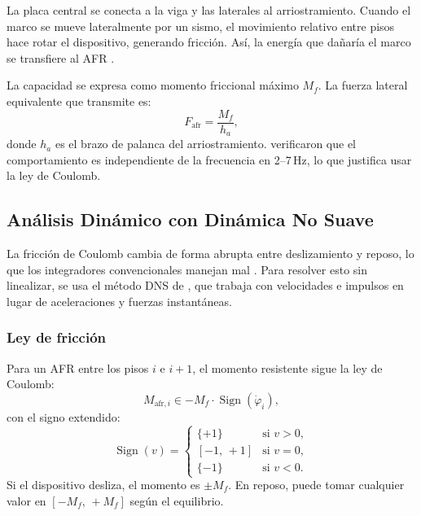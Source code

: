 \documentclass[preprint,12pt,authoryear]{elsarticle}
\newcommand{\Mf}{M_{\!f}}
\newcommand{\ha}{h_a}
\begin{document}
La placa central se conecta a la viga y las laterales al arriostramiento.
Cuando el marco se mueve lateralmente por un sismo, el movimiento relativo
entre pisos hace rotar el dispositivo, generando fricción. Así, la energía
que dañaría el marco se transfiere al AFR \citep{kim_use_2011}.

La capacidad se expresa como momento friccional máximo $\Mf$. La fuerza
lateral equivalente que transmite es:
\begin{equation}
    F_{\mathrm{afr}} = \frac{\Mf}{\ha},
    \label{eq:Fafr}
\end{equation}
donde $\ha$ es el brazo de palanca del arriostramiento. \citet{Mualla2002}
verificaron que el comportamiento es independiente de la frecuencia en
2--7\,Hz, lo que justifica usar la ley de Coulomb.

\subsection{Análisis Dinámico con Dinámica No Suave}
\label{sec:theory:dns}

La fricción de Coulomb cambia de forma abrupta entre deslizamiento y reposo,
lo que los integradores convencionales manejan mal
\citep{chopra_dynamics_2015}. Para resolver esto sin linealizar, se usa el
método DNS de \citet{Namorado2024}, que trabaja con velocidades e impulsos
en lugar de aceleraciones y fuerzas instantáneas.

\subsubsection*{Ley de fricción}

Para un AFR entre los pisos $i$ e $i+1$, el momento resistente sigue la ley
de Coulomb:
\begin{equation}
    M_{\mathrm{afr},i} \in -\Mf \cdot \operatorname{Sign}\!\left(\dot{\varphi}_i\right),
    \label{eq:coulomb}
\end{equation}
con el signo extendido:
\begin{equation}
    \operatorname{Sign}(v) =
    \begin{cases}
        \{+1\}    & \text{si } v > 0, \\
        [-1,\,+1] & \text{si } v = 0, \\
        \{-1\}    & \text{si } v < 0.
    \end{cases}
    \label{eq:sign}
\end{equation}
Si el dispositivo desliza, el momento es $\pm\Mf$. En reposo, puede tomar
cualquier valor en $[-\Mf,\,+\Mf]$ según el equilibrio.
\end{document}
